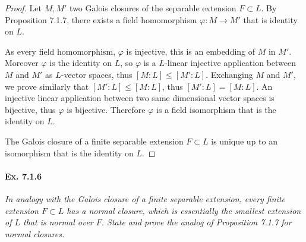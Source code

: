 \documentclass[11pt,a4paper]{article}
\begin{document}
\begin{proof}
Let $M,M'$ two Galois closures of the separable extension $F \subset L$.
By Proposition 7.1.7, there exists a field homomorphism  $\varphi : M\to M'$ that is identity on $L$.

As every field homomorphism, $\varphi$ is injective, this is an embedding of $M$ in $M'$. Moreover $\varphi$ is the identity on $L$, so $\varphi$ is a $L$-linear injective application between  $M$ and $M'$ as $L$-vector spaces, thus $[M:L] \leq [M':L]$. Exchanging $M$ and $M'$, we prove similarly that $[M':L] \leq [M:L]$, thus $[M':L] = [M:L]$. An injective linear application between two same dimensional vector spaces is bijective, thus $\varphi$ is bijective. Therefore $\varphi$ is a field isomorphism that is the identity on $L$.

The Galois closure of a finite separable extension $F \subset L$ is unique up to an isomorphism that is the identity on $L$.
\end{proof}

\paragraph{Ex. 7.1.6}

{\it In analogy with the Galois closure of a finite separable extension, every finite extension $F \subset L$ has a normal closure, which is essentially the smallest extension of $L$ that is normal over $F$. State and prove the analog of Proposition 7.1.7 for normal closures.
}

\bigskip
\end{document}

